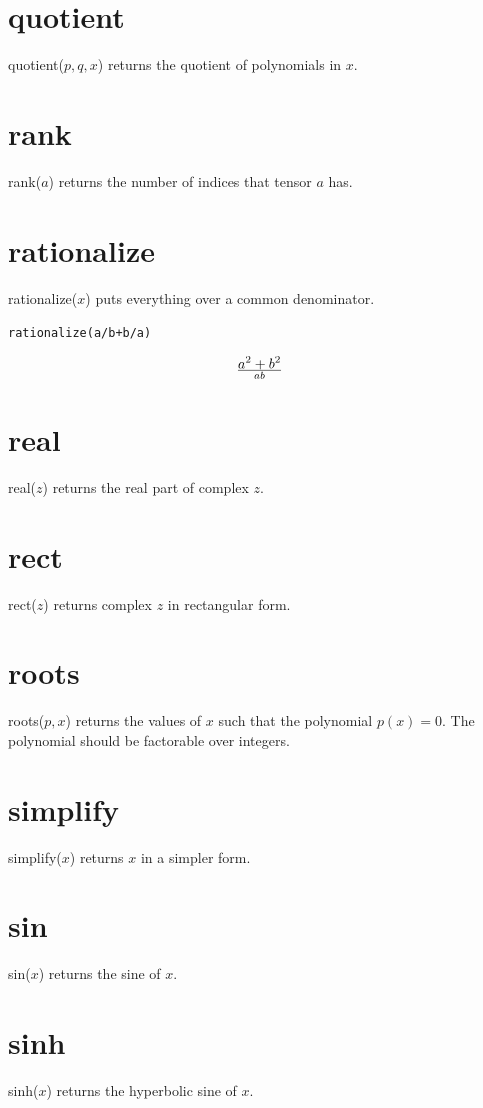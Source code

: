 \documentclass[12pt,openany]{report}
\begin{document}
\section*{quotient}
quotient($p,q,x$) returns the quotient of polynomials in $x$.

\section*{rank}
rank($a$) returns the number of indices that tensor $a$ has.

\section*{rationalize}
rationalize($x$) puts everything over a common denominator.

\medskip
{\tt rationalize(a/b+b/a)}

$$a^2+b^2\over ab$$

\section*{real}
real($z$) returns the real part of complex $z$.

\section*{rect}
rect($z$) returns complex $z$ in rectangular form.

\section*{roots}
roots($p,x$) returns the values of $x$ such that the polynomial $p(x)=0$.
The polynomial should be factorable over integers.

\section*{simplify}
simplify($x$) returns $x$ in a simpler form.

\section*{sin}
sin($x$) returns the sine of $x$.

\section*{sinh}
sinh($x$) returns the hyperbolic sine of $x$.
\end{document}
